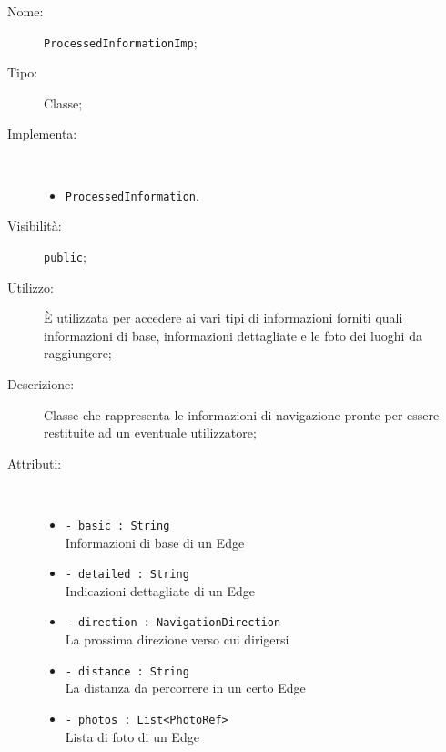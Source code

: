 \documentclass[../DefinizioneDiProdotto.tex]{subfiles}
\begin{document}
\begin{description}
	\item[Nome:] \texttt{ProcessedInformationImp};
	\item[Tipo:] Classe;
	\item[Implementa:] \
	\begin{itemize}
		\item \texttt{ProcessedInformation}.
		
	\end{itemize}
	\item[Visibilità:] \texttt{public};
	\item[Utilizzo:] È utilizzata per accedere ai vari tipi di informazioni forniti quali informazioni di base, informazioni dettagliate e le foto dei luoghi da raggiungere;
	\item[Descrizione:] Classe che rappresenta le informazioni di navigazione pronte per essere restituite ad un eventuale utilizzatore;
	\item[Attributi:] \
	\begin{itemize}
		\item \texttt{- basic : String}\\
		Informazioni di base di un Edge
		
		\item \texttt{- detailed : String}\\
		Indicazioni dettagliate di un Edge
		
		\item \texttt{- direction : NavigationDirection}\\
		La prossima direzione verso cui dirigersi
		
		\item \texttt{- distance : String}\\
		La distanza da percorrere in un certo Edge
		
		\item \texttt{- photos : List<PhotoRef>}\\
		Lista di foto di un Edge
		

\end{itemize}
\end{description}
\end{document}
